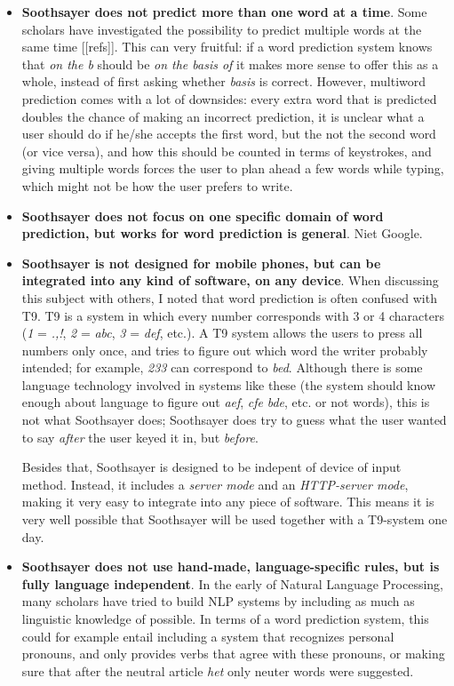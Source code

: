 \documentclass[12pt]{article}
\begin{document}
\begin{itemize}
\item \textbf{Soothsayer does not predict more than one word at a time}. Some scholars have investigated the possibility to predict multiple words at the same time [[refs]]. This can very fruitful: if a word prediction system knows that \emph{on the b} should be \emph{on the basis of} it makes more sense to offer this as a whole, instead of first asking whether \emph{basis} is correct. However, multiword prediction comes with a lot of downsides: every extra word that is predicted doubles the chance of making an incorrect prediction, it is unclear what a user should do if he/she accepts the first word, but the not the second word (or vice versa), and how this should be counted in terms of keystrokes, and giving multiple words forces the user to plan ahead a few words while typing, which might not be how the user prefers to write. %

\item \textbf{Soothsayer does not focus on one specific domain of word prediction, but works for word prediction is general}. Niet Google.

\item \textbf{Soothsayer is not designed for mobile phones, but can be integrated into any kind of software, on any device}. When discussing this subject with others, I noted that word prediction is often confused with T9. T9 is a system in which every number corresponds with 3 or 4 characters (\emph{1} = \emph{.,!}, \emph{2} = \emph{abc}, \emph{3} = \emph{def}, etc.). A T9 system allows the users to press all numbers only once, and tries to figure out which word the writer probably intended; for example, \emph{233} can correspond to \emph{bed}. Although there is some language technology involved in systems like these (the system should know enough about language to figure out \emph{aef}, \emph{cfe} \emph{bde}, etc. or not words), this is not what Soothsayer does; Soothsayer does try to guess what the user wanted to say \emph{after} the user keyed it in, but \emph{before}. 

Besides that, Soothsayer is designed to be indepent of device of input method. Instead, it includes a \emph{server mode} and an \emph{HTTP-server mode}, making it very easy to integrate into any piece of software. This means it is very well possible that Soothsayer will be used together with a T9-system one day.

\item \textbf{Soothsayer does not use hand-made, language-specific rules, but is fully language independent}. In the early of Natural Language Processing, many scholars have tried to build NLP systems by including as much as linguistic knowledge of possible. In terms of a word prediction system, this could for example entail including a system that recognizes personal pronouns, and only provides verbs that agree with these pronouns, or making sure that after the neutral article \emph{het} only neuter words were suggested. 


\end{itemize}
\end{document}
